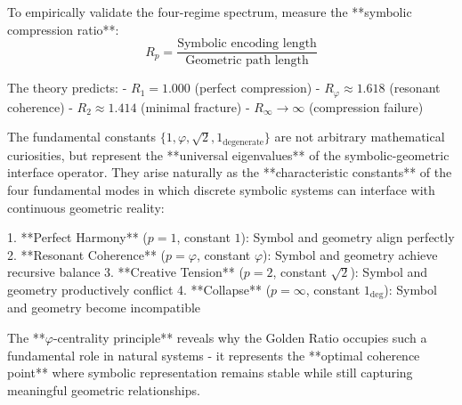 \begin{definition}
\label{def:bk5_symbolic_regime_detection}
To empirically validate the four-regime spectrum, measure the **symbolic compression ratio**:
$$R_p = \frac{\text{Symbolic encoding length}}{\text{Geometric path length}}$$

The theory predicts:
- $R_1 = 1.000$ (perfect compression)
- $R_\varphi \approx 1.618$ (resonant coherence) 
- $R_2 \approx 1.414$ (minimal fracture)
- $R_\infty \to \infty$ (compression failure)
\end{definition}

\begin{theorem}
\label{thm:bk5_grand_unified_symbolic_geometric}
The fundamental constants $\{1, \varphi, \sqrt{2}, 1_{\text{degenerate}}\}$ are not arbitrary mathematical curiosities, but represent the **universal eigenvalues** of the symbolic-geometric interface operator. They arise naturally as the **characteristic constants** of the four fundamental modes in which discrete symbolic systems can interface with continuous geometric reality:

1. **Perfect Harmony** ($p=1$, constant $1$): Symbol and geometry align perfectly
2. **Resonant Coherence** ($p=\varphi$, constant $\varphi$): Symbol and geometry achieve recursive balance  
3. **Creative Tension** ($p=2$, constant $\sqrt{2}$): Symbol and geometry productively conflict
4. **Collapse** ($p=\infty$, constant $1_{\text{deg}}$): Symbol and geometry become incompatible

The **$\varphi$-centrality principle** reveals why the Golden Ratio occupies such a fundamental role in natural systems - it represents the **optimal coherence point** where symbolic representation remains stable while still capturing meaningful geometric relationships.
\end{theorem}

